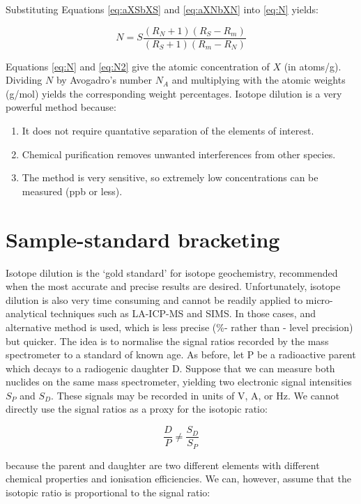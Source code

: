 \documentclass{book}
\begin{document}
Substituting Equations \ref{eq:aXSbXS} and \ref{eq:aXNbXN} into
\ref{eq:N} yields:

\begin{equation}
N = S \frac{(R_N+1)(R_S-R_m)}{(R_S+1)(R_m-R_N)}
\label{eq:N2}
\end{equation}

Equations \ref{eq:N} and \ref{eq:N2} give the atomic concentration of
$X$ (in atoms/g).  Dividing $N$ by Avogadro's number $N_A$ and
multiplying with the atomic weights (g/mol) yields the corresponding
weight percentages. Isotope dilution is a very powerful method
because:

\begin{enumerate}
\item It does not require quantative separation of the elements of
  interest.
\item Chemical purification removes unwanted interferences from other
  species.
\item The method is very sensitive, so extremely low concentrations
  can be measured (ppb or less).
\end{enumerate}

\section{Sample-standard bracketing}
\label{sec:bracketing}

Isotope dilution is the `gold standard' for isotope geochemistry,
recommended when the most accurate and precise results are
desired. Unfortunately, isotope dilution is also very time consuming
and cannot be readily applied to micro-analytical techniques such as
LA-ICP-MS and SIMS. In those cases, and alternative method is used,
which is less precise (\%- rather than \permil- level precision) but
quicker.  The idea is to normalise the signal ratios recorded by the
mass spectrometer to a standard of known age.  As before, let P be a
radioactive parent which decays to a radiogenic daughter D. Suppose
that we can measure both nuclides on the same mass spectrometer,
yielding two electronic signal intensities $S_P$ and $S_D$. These
signals may be recorded in units of V, A, or Hz. We cannot directly
use the signal ratios as a proxy for the isotopic ratio:

$$\frac{D}{P} \neq \frac{S_D}{S_P}$$

because the parent and daughter are two different elements with
different chemical properties and ionisation efficiencies. We can,
however, assume that the isotopic ratio is proportional to the signal
ratio:
\end{document}
